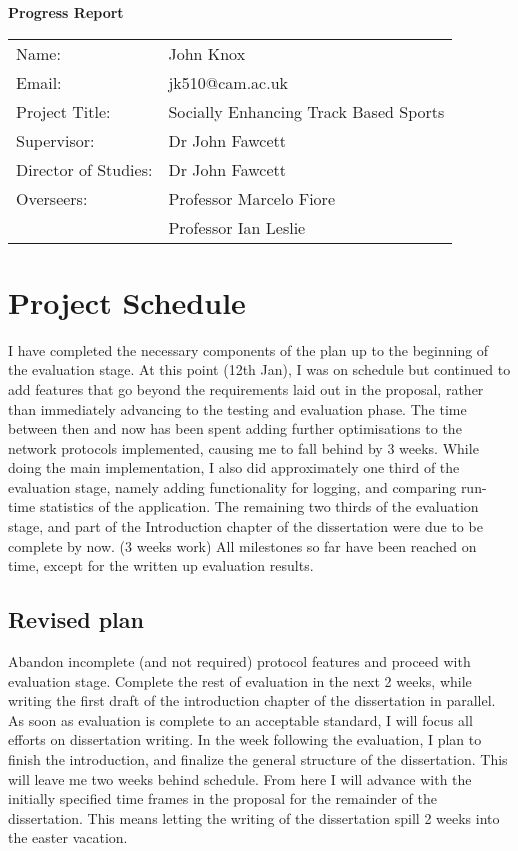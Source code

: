 \documentclass{article}
\begin{document}
\huge{\bf Progress Report}
\\
{\large
\begin{tabular}{ll}
Name:                & John Knox                             \\
Email:               & jk510@cam.ac.uk                       \\
Project Title:       & Socially Enhancing Track Based Sports \\
Supervisor:          & Dr John Fawcett                           \\
Director of Studies: & Dr John Fawcett                           \\
Overseers:           & Professor Marcelo Fiore                   \\
                     & Professor Ian Leslie                      \\
\end{tabular}
}

\normalsize
\section*{Project Schedule}

I have completed the necessary components of the plan up to the beginning of the evaluation stage.
At this point (12th Jan), I was on schedule but continued to add features that go beyond the requirements laid out in the proposal, rather than immediately advancing to the testing and evaluation phase. The time between then and now has been spent adding further optimisations to the network protocols implemented, causing me to fall behind by 3 weeks.
While doing the main implementation, I also did approximately one third of the evaluation stage, namely adding functionality for logging, and comparing run-time statistics of the application. The remaining two thirds of the evaluation stage, and part of the Introduction chapter of the dissertation were due to be complete by now. (3 weeks work)
All milestones so far have been reached on time, except for the written up evaluation results.

\subsection*{Revised plan}
Abandon incomplete (and not required) protocol features and proceed with evaluation stage.
Complete the rest of evaluation in the next 2 weeks, while writing the first draft of the introduction chapter of the dissertation in parallel.
As soon as evaluation is complete to an acceptable standard, I will focus all efforts on dissertation writing.
In the week following the evaluation, I plan to finish the introduction, and finalize the general structure of the dissertation.
This will leave me two weeks behind schedule.
From here I will advance with the initially specified time frames in the proposal for the remainder of the dissertation. This means letting the writing of the dissertation spill 2 weeks into the easter vacation.
\end{document}
